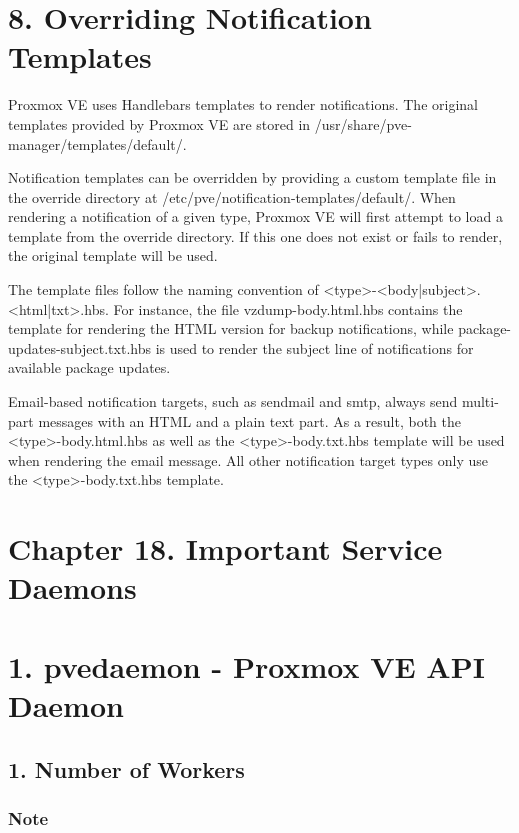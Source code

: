 \section{8. Overriding Notification Templates}

Proxmox VE uses Handlebars templates to render notifications. The original templates provided by Proxmox VE are stored in /usr/share/pve-manager/templates/default/.

Notification templates can be overridden by providing a custom template file in the override directory at /etc/pve/notification-templates/default/. When rendering a notification of a given type, Proxmox VE will first attempt to load a template from the override directory. If this one does not exist or fails to render, the original template will be used.

The template files follow the naming convention of <type>-<body|subject>.<html|txt>.hbs. For instance, the file vzdump-body.html.hbs contains the template for rendering the HTML version for backup notifications, while package-updates-subject.txt.hbs is used to render the subject line of notifications for available package updates.

Email-based notification targets, such as sendmail and smtp, always send multi-part messages with an HTML and a plain text part. As a result, both the <type>-body.html.hbs as well as the <type>-body.txt.hbs template will be used when rendering the email message. All other notification target types only use the <type>-body.txt.hbs template.


\section{Chapter 18. Important Service Daemons}


\section{1. pvedaemon - Proxmox VE API Daemon}

\subsection{1. Number of Workers}

\subsubsection{Note}

